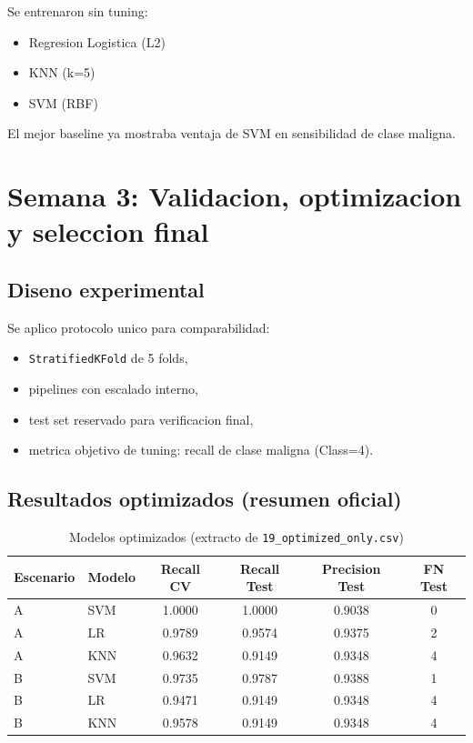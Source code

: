 \documentclass[11pt,a4paper]{article}
\begin{document}
Se entrenaron sin tuning:

\begin{itemize}[leftmargin=1.2cm]
\item Regresion Logistica (L2)
\item KNN (k=5)
\item SVM (RBF)
\end{itemize}

El mejor baseline ya mostraba ventaja de SVM en sensibilidad de clase maligna.

\section{Semana 3: Validacion, optimizacion y seleccion final}

\subsection{Diseno experimental}

Se aplico protocolo unico para comparabilidad:

\begin{itemize}[leftmargin=1.2cm]
\item \texttt{StratifiedKFold} de 5 folds,\
\item pipelines con escalado interno,\
\item test set reservado para verificacion final,\
\item metrica objetivo de tuning: recall de clase maligna (Class=4).
\end{itemize}

\subsection{Resultados optimizados (resumen oficial)}

\begin{table}[H]
\centering
\caption{Modelos optimizados (extracto de \texttt{19\_optimized\_only.csv})}
\begin{tabular}{llcccc}
\toprule
Escenario & Modelo & Recall CV & Recall Test & Precision Test & FN Test \\
\midrule
A & SVM & 1.0000 & 1.0000 & 0.9038 & 0 \\
A & LR & 0.9789 & 0.9574 & 0.9375 & 2 \\
A & KNN & 0.9632 & 0.9149 & 0.9348 & 4 \\
B & SVM & 0.9735 & 0.9787 & 0.9388 & 1 \\
B & LR & 0.9471 & 0.9149 & 0.9348 & 4 \\
B & KNN & 0.9578 & 0.9149 & 0.9348 & 4 \\
\bottomrule
\end{tabular}
\end{table}
\end{document}
